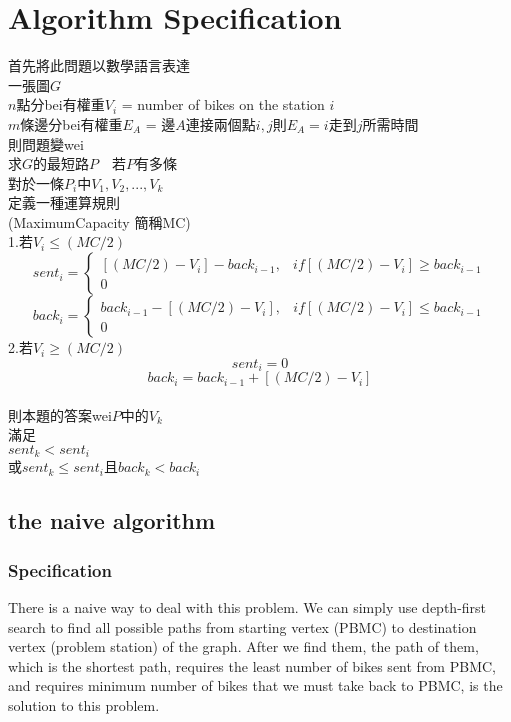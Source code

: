 \chapter{Algorithm Specification}

首先將此問題以數學語言表達\\

一張圖$G$\\
$n$點分bei有權重$V_i$ = number of bikes on the station $i$\\
$m$條邊分bei有權重$E_A$ = 邊$A$連接兩個點$i, j$則$E_A = i$走到$j$所需時間\\

則問題變wei\\

求$G$的最短路$P$~~若$P$有多條\\
對於一條$P_i$中$V_1, V_2, ..., V_k$\\
定義一種運算規則\\
(MaximumCapacity 簡稱MC)\\
1.若$V_i \leq (MC / 2)$
\[sent_i =
\begin{cases}
	[(MC / 2) - V_i] - back_{i - 1}, 
	& if [(MC / 2) - V_i] \geq back_{i - 1}\\
	0
\end{cases}
\]
\[back_i =
\begin{cases}
	back_{i - 1} - [(MC / 2) - V_i], 
	& if [(MC / 2) - V_i] \leq back_{i - 1}\\
	0
\end{cases}
\]	
2.若$V_i \geq (MC / 2)$
\[sent_i = 0\]
\[back_i = back_{i - 1} + [(MC / 2) - V_i]\]
\\
則本題的答案wei$P$中的$V_k$\\
滿足\\
$sent_k < sent_i$\\
或$sent_k \leq sent_i$且$back_k < back_i$\\




\section{the naive algorithm}

\subsection{Specification}

There is a naive way to deal with this problem. We can simply use depth-first search to find all possible paths from starting vertex (PBMC) to destination vertex (problem station) of the graph. After we find them, the path of them, which is the shortest path, requires the
least number of bikes sent from PBMC, and requires minimum
number of bikes that we must take back to PBMC, is the solution to this problem.

